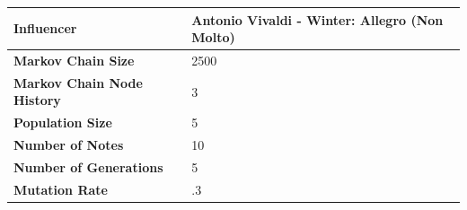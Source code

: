 \documentclass[12pt]{article} %
\begin{document}
\begin{center}
	 \label{tab:init_settings_results} 
    \begin{tabular}{|l|l|}
        \hline
	\bf{Influencer}         & Antonio Vivaldi - Winter: Allegro (Non Molto)\\ \hline
	\bf{Markov Chain Size}         & 2500 \\ \hline
	\bf{Markov Chain Node History} & 3    \\ \hline 
	\bf{Population Size}           & 5    \\ \hline
	\bf{Number of Notes}           & 10   \\ \hline 
	\bf{Number of Generations}     & 5    \\ \hline 
	\bf{Mutation Rate}             & .3   \\ \hline
    \end{tabular}
\end{center}
\end{document}
